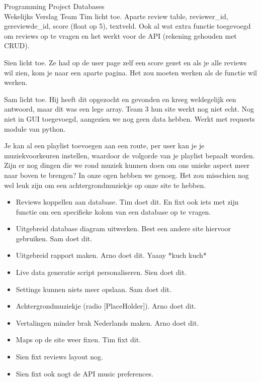 \documentclass{article}
\newcounter{team}
\begin{document}
\begin{Minutes}{Programming Project Databases \\ Wekelijks Verslag Team }
				    Tim licht toe. Aparte review table, reviewer_id, gereviewde\_id, score (float op 5), textveld. Ook al wat extra functie toegevoegd om reviews op te vragen en het werkt voor de API (rekening gehouden met CRUD).

				    Sien licht toe. Ze had op de user page zelf een score gezet en als je alle reviews wil zien, kom je naar een aparte pagina. Het zou moeten werken als de functie wil werken.

				    Sam licht toe. Hij heeft dit opgezocht en gevonden en kreeg weldegelijk een antwoord, maar dit was een lege array. Team 3 hun site werkt nog niet echt. Nog niet in GUI toegevoegd, aangezien we nog geen data hebben. Werkt met requests module van python.

				    Je kan al een playlist toevoegen aan een route, per user kan je je muziekvoorkeuren instellen, waardoor de volgorde van je playlist bepaalt worden. Zijn er nog dingen die we rond muziek kunnen doen om ons unieke aspect meer naar boven te brengen? In onze ogen hebben we genoeg. Het zou misschien nog wel leuk zijn om een achtergrondmuziekje op onze site te hebben.


			\begin{itemize}
			   \item Reviews koppellen aan database. Tim doet dit. En fixt ook iets met zijn functie om een specifieke kolom van een database op te vragen.
			   \item Uitgebreid database diagram uitwerken. Best een andere site hiervoor gebruiken. Sam doet dit.
			   \item Uitgebreid rapport maken. Arno doet dit. Yaaay *kuch kuch*
			   \item Live data generatie script personaliseren. Sien doet dit.
			   \item Settings kunnen niets meer opslaan. Sam doet dit.
			   \item Achtergrondmuziekje (radio [PlaceHolder]). Arno doet dit.
			   \item Vertalingen minder brak Nederlands maken. Arno doet dit.
			   \item Maps op de site weer fixen. Tim fixt dit.
			   \item Sien fixt reviews layout nog.
			   \item Sien fixt ook nogt de API music preferences.
			\end{itemize}



\end{Minutes}
\end{document}
